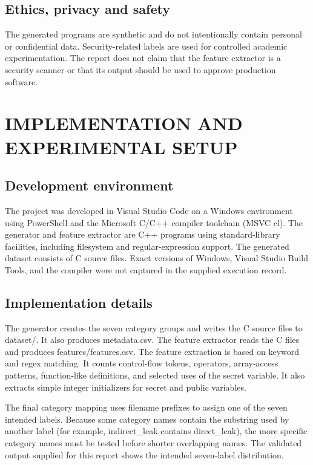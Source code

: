 \documentclass[12pt,a4paper,oneside]{report}
\begin{document}
\section{Ethics, privacy and safety}
The generated programs are synthetic and do not intentionally contain personal or confidential data. Security-related labels are used for controlled academic experimentation. The report does not claim that the feature extractor is a security scanner or that its output should be used to approve production software.\par

\chapter{IMPLEMENTATION AND EXPERIMENTAL SETUP}

\section{Development environment}
The project was developed in Visual Studio Code on a Windows environment using PowerShell and the Microsoft C/C++ compiler toolchain (MSVC cl). The generator and feature extractor are C++ programs using standard-library facilities, including filesystem and regular-expression support. The generated dataset consists of C source files. Exact versions of Windows, Visual Studio Build Tools, and the compiler were not captured in the supplied execution record.\par

\section{Implementation details}
The generator creates the seven category groups and writes the C source files to dataset/. It also produces metadata.csv. The feature extractor reads the C files and produces features/features.csv. The feature extraction is based on keyword and regex matching. It counts control-flow tokens, operators, array-access patterns, function-like definitions, and selected uses of the secret variable. It also extracts simple integer initializers for secret and public variables.\par
The final category mapping uses filename prefixes to assign one of the seven intended labels. Because some category names contain the substring used by another label (for example, indirect\_leak contains direct\_leak), the more specific category names must be tested before shorter overlapping names. The validated output supplied for this report shows the intended seven-label distribution.\par
\end{document}
